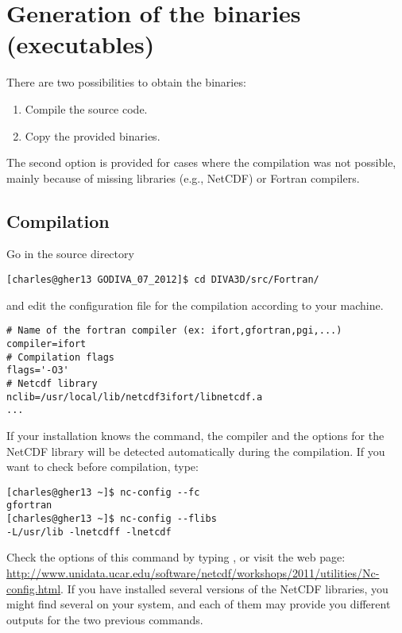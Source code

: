 \section{Generation of the binaries (executables)}

There are two possibilities to obtain the binaries: 
\begin{enumerate}
\item Compile the source code.
\item Copy the provided binaries.
\end{enumerate}
The second option is provided for cases where the compilation was not possible, mainly because of missing libraries (e.g., NetCDF) or Fortran compilers.

\subsection{Compilation\label{sec:compilation}}

Go in the source directory 
\begin{lstlisting}[style=Bash]
[charles@gher13 GODIVA_07_2012]$ cd DIVA3D/src/Fortran/
\end{lstlisting}
and edit the configuration file  for the compilation  according to your machine. 

\begin{verbatim}
# Name of the fortran compiler (ex: ifort,gfortran,pgi,...)
compiler=ifort
# Compilation flags
flags='-O3'
# Netcdf library
nclib=/usr/local/lib/netcdf3ifort/libnetcdf.a
...
\end{verbatim}

If your installation knows the  command, the compiler and the options for the NetCDF  library will be detected automatically during the compilation. If you want to check before compilation, type:
\begin{lstlisting}[style=Bash]
[charles@gher13 ~]$ nc-config --fc
gfortran
[charles@gher13 ~]$ nc-config --flibs
-L/usr/lib -lnetcdff -lnetcdf
\end{lstlisting}
Check the options of this command by typing , or visit the web page: \url{http://www.unidata.ucar.edu/software/netcdf/workshops/2011/utilities/Nc-config.html}. If you have installed several versions of the NetCDF libraries, you might find several  on your system, and each of them may provide you different outputs for the two previous commands.





